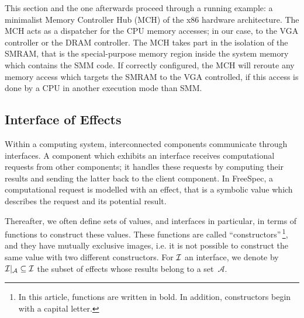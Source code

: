 This section and the one afterwards proceed through a running example: a
minimalist Memory Controller Hub (MCH) of the x86 hardware architecture.
%
The MCH acts as a dispatcher for the CPU memory accesses; in our case, to the
VGA controller or the DRAM controller.
%
The MCH takes part in the isolation of the SMRAM, that is the special-purpose
memory region inside the system memory which contains the SMM code.
%
If correctly configured, the MCH will reroute any memory access which targets
the SMRAM to the VGA controlled, if this access is done by a CPU in another
execution mode than SMM.

%

\subsection{Interface of Effects}

Within a computing system, interconnected components communicate through
interfaces.
%
A component which exhibits an interface receives computational requests from
other components; it handles these requests by computing their results and
sending the latter back to the client component.
%
In FreeSpec, a computational request is modelled with an effect, that is a
symbolic value which describes the request and its potential result.

Thereafter, we often define sets of values, and interfaces in particular, in
terms of functions to construct these values.
%
These functions are called ``constructors''\,\footnote{In this article,
functions are written in bold. In addition, constructors begin with a capital
letter.}, and they have mutually exclusive images, i.e. it is not possible to
construct the same value with two different constructors.
%
For $\mathcal{I}$ an interface, we denote by $\mathcal{I}|_{\mathcal{A}}
\subseteq \mathcal{I}$ the subset of effects whose results belong to a set~$\mathcal{A}$.

